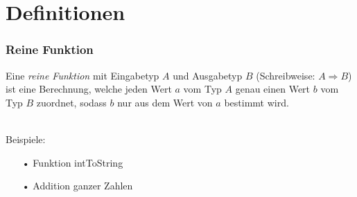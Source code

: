 	\section[Section]{Definitionen}
	\begin{frame}
		\frametitle{Reine Funktion}
		\begin{definition}
			Eine \emph{reine Funktion} mit Eingabetyp $A$ und Ausgabetyp $B$ (Schreibweise: $A				\Rightarrow B$)
			ist eine Berechnung, welche jeden Wert $a$ vom Typ $A$ genau einen Wert 			$b$ vom Typ $B$ zuordnet, sodass $b$ nur aus dem Wert von $a$ bestimmt 				wird.
		\end{definition} 
		\leavevmode \\
		Beispiele: 
		\begin{itemize}
		\item[•] Funktion intToString 
		\item[•] Addition ganzer Zahlen
		\end{itemize}
	\end{frame}
	